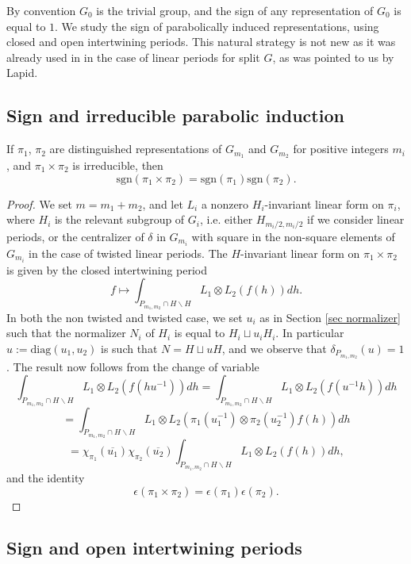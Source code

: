 \documentclass[11pt,letterpaper]{amsart}
\def\d{\delta}
\def\e{\epsilon}
\def\diag{\mathrm{diag}}
\theoremstyle{plain}
\numberwithin{equation}{section}
\newcommand{\sg}{\mathrm{sgn}}
\begin{document}
By convention $G_0$ is the trivial group, and the sign of any representation of $G_0$ is equal to $1$. We study the sign of parabolically induced representations, using closed and open intertwining periods. This natural strategy is not new as it was already used in \cite[Lemma 3.5]{LM} in the case of linear periods for split $G$, as was pointed to us by Lapid. 

\subsection{Sign and irreducible parabolic induction}

\begin{prop}\label{prop closed sign}
If $\pi_1$, $\pi_2$ are distinguished representations of $G_{m_1}$ and $G_{m_2}$ for positive integers $m_i$, and $\pi_1\times \pi_2$ is irreducible, then 
\[\sg(\pi_1\times \pi_2)=\sg(\pi_1)\sg(\pi_2).\]
\end{prop}
\begin{proof}
We set $m=m_1+m_2$, and let $L_i$ a nonzero $H_i$-invariant linear form on $\pi_i$, where $H_i$ is the relevant subgroup of $G_i$, 
i.e. either $H_{m_i/2,m_i/2}$ if we consider linear periods, or the centralizer of $\d$ in $G_{m_i}$ with square in the non-square elements of $G_{m_i}$ in the case of twisted linear periods. The $H$-invariant linear form on $\pi_1\times \pi_2$ is given by the closed intertwining period 
\[f\mapsto \int_{P_{m_1,m_2}\cap H\backslash H} L_1\otimes L_2(f(h)) dh.\] In both the non twisted and twisted case, we set $u_i$ as in Section \ref{sec normalizer} such that the normalizer $N_i$ of $H_i$ is equal to $H_i\sqcup u_i H_i$. In particular $u:=\diag(u_1,u_2)$ is such that $N=H\sqcup u H$, and we observe that $\d_{P_{m_1,m_2}}(u)=1$. The result now follows from the change of variable 
\[\int_{P_{m_1,m_2}\cap H\backslash H} L_1\otimes L_2(f(hu^{-1})) dh=\int_{P_{m_1,m_2}\cap H\backslash H} L_1\otimes L_2(f(u^{-1}h)) dh\]
\[=\int_{P_{m_1,m_2}\cap H\backslash H} L_1\otimes L_2(\pi_1(u_1^{-1})\otimes \pi_2(u_2^{-1})f(h)) dh\]
\[=\chi_{\pi_1}(\overline{u_1})\chi_{\pi_2}(\overline{u_2})\int_{P_{m_1,m_2}\cap H\backslash H} L_1\otimes L_2(f(h)) dh,\] and the identity 
\[\e(\pi_1\times\pi_2)=\e(\pi_1)\e(\pi_2).\]  
\end{proof}

\subsection{Sign and open intertwining periods}\label{sec sg open periods}
\end{document}
